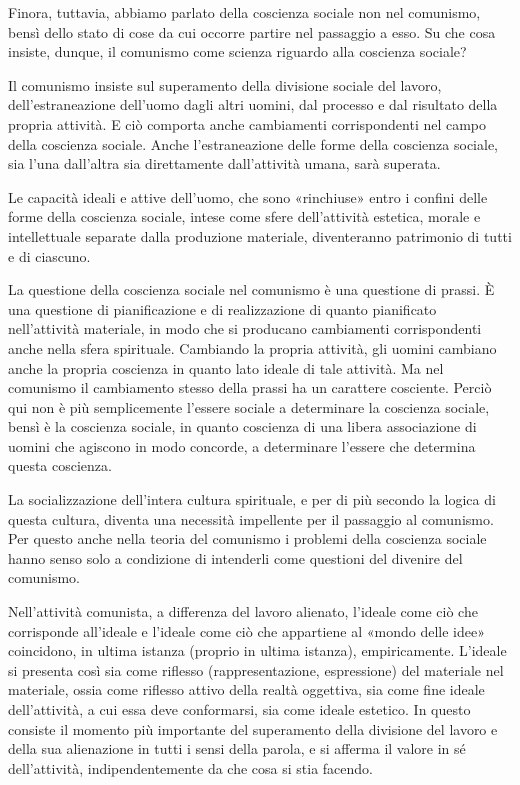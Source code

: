 \documentclass[../main]{subfiles}
\begin{document}
Finora, tuttavia, abbiamo parlato della coscienza sociale non nel comunismo, bensì dello stato di cose da cui occorre partire nel passaggio a esso. Su che cosa insiste, dunque, il comunismo come scienza riguardo alla coscienza sociale?

Il comunismo insiste sul superamento della divisione sociale del lavoro, dell'estraneazione dell'uomo dagli altri uomini, dal processo e dal risultato della propria attività. E ciò comporta anche cambiamenti corrispondenti nel campo della coscienza sociale. Anche l'estraneazione delle forme della coscienza sociale, sia l'una dall'altra sia direttamente dall'attività umana, sarà superata.

Le capacità ideali e attive dell'uomo, che sono «rinchiuse» entro i confini delle forme della coscienza sociale, intese come sfere dell'attività estetica, morale e intellettuale separate dalla produzione materiale, diventeranno patrimonio di tutti e di ciascuno.

La questione della coscienza sociale nel comunismo è una questione di prassi. È una questione di pianificazione e di realizzazione di quanto pianificato nell'attività materiale, in modo che si producano cambiamenti corrispondenti anche nella sfera spirituale. Cambiando la propria attività, gli uomini cambiano anche la propria coscienza in quanto lato ideale di tale attività. Ma nel comunismo il cambiamento stesso della prassi ha un carattere cosciente. Perciò qui non è più semplicemente l'essere sociale a determinare la coscienza sociale, bensì è la coscienza sociale, in quanto coscienza di una libera associazione di uomini che agiscono in modo concorde, a determinare l'essere che determina questa coscienza.

La socializzazione dell'intera cultura spirituale, e per di più secondo la logica di questa cultura, diventa una necessità impellente per il passaggio al comunismo. Per questo anche nella teoria del comunismo i problemi della coscienza sociale hanno senso solo a condizione di intenderli come questioni del divenire del comunismo.

Nell'attività comunista, a differenza del lavoro alienato, l'ideale come ciò che corrisponde all'ideale e l'ideale come ciò che appartiene al «mondo delle idee» coincidono, in ultima istanza (proprio in ultima istanza), empiricamente. L'ideale si presenta così sia come riflesso (rappresentazione, espressione) del materiale nel materiale, ossia come riflesso attivo della realtà oggettiva, sia come fine ideale dell'attività, a cui essa deve conformarsi, sia come ideale estetico. In questo consiste il momento più importante del superamento della divisione del lavoro e della sua alienazione in tutti i sensi della parola, e si afferma il valore in sé dell'attività, indipendentemente da che cosa si stia facendo.
\end{document}
